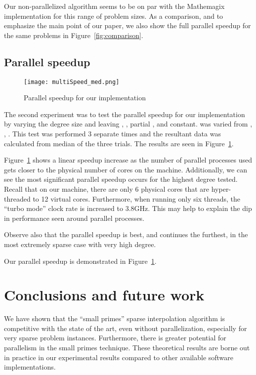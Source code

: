 \documentclass[letterpaper,10pt]{article}
\begin{document}
Our non-parallelized algorithm seems to be on par with the Mathemagix
implementation for this range of problem sizes. As a comparison, and to
emphasize the main point of our paper, we also show the full parallel
speedup for the same problems in Figure~\ref{fig:comparison}. 

\subsection{Parallel speedup}

\begin{figure}[tbp]
\texttt{[image: multiSpeed\_med.png]}
\caption{Parallel speedup for our implementation\label{fig:speedup}}
\end{figure}

The second experiment was to test the parallel speedup for our implementation by 
varying the degree size  and leaving , , partial , and  constant. 
was varied from , , . This test was performed 3 separate times 
and the resultant data was calculated from median of the three trials. 
The results are seen in Figure~\ref{fig:speedup}. 

Figure~\ref{fig:speedup} shows a linear speedup increase as the number of 
parallel processes used gets closer to the physical number of cores on the machine.
Additionally, we can see the most significant parallel speedup occurs for the highest
degree tested. Recall that on our machine, there are only 6 physical
cores that are hyper-threaded to 12 virtual cores. Furthermore, when
running only six threads, the ``turbo mode'' clock rate is increased to
3.8GHz. This may help to
explain the dip in performance seen around  parallel processes.

Observe also that the parallel speedup is best, and continues the
furthest, in the most extremely sparse case with very high degree.

Our parallel speedup is demonstrated in Figure~\ref{fig:speedup}.

\section{Conclusions and future work}
\label{sec:conc}

We have shown that the ``small primes'' sparse interpolation algorithm
is competitive with the state of the art, even without parallelization,
especially for very sparse problem instances. Furthermore, there is
greater potential for parallelism in the small primes technique. These
theoretical results are borne out in practice in our experimental results
compared to other available software implementations.
\end{document}
